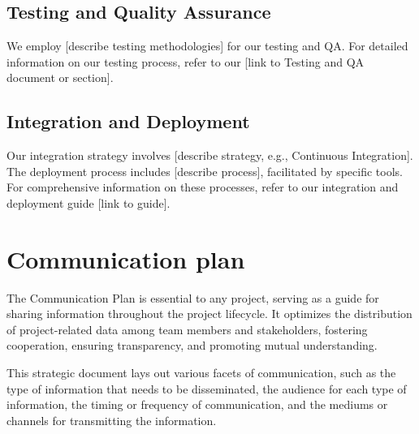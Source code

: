 \documentclass[10pt]{projectdoc}
\begin{document}
\subsection{Testing and Quality Assurance}

We employ [describe testing methodologies] for our testing and QA. For detailed information on our testing process, refer to our [link to Testing and QA document or section].

\subsection{Integration and Deployment}

Our integration strategy involves [describe strategy, e.g., Continuous Integration]. The deployment process includes [describe process], facilitated by specific tools. For comprehensive information on these processes, refer to our integration and deployment guide [link to guide].

\newpage
\section{Communication plan}

The Communication Plan is essential to any project, serving as a guide for sharing information throughout the project lifecycle. It optimizes the distribution of project-related data among team members and stakeholders, fostering cooperation, ensuring transparency, and promoting mutual understanding.

This strategic document lays out various facets of communication, such as the type of information that needs to be disseminated, the audience for each type of information, the timing or frequency of communication, and the mediums or channels for transmitting the information.
\end{document}
